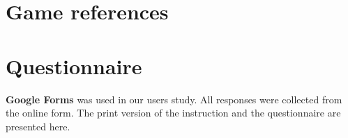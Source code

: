 \chapter{Game references}

\printglossaries

\chapter{Questionnaire}
\label{app:questionnaire}

\textbf{Google Forms} was used in our users study. All responses were collected from the online form. The print version of the instruction and the questionnaire are presented here.




